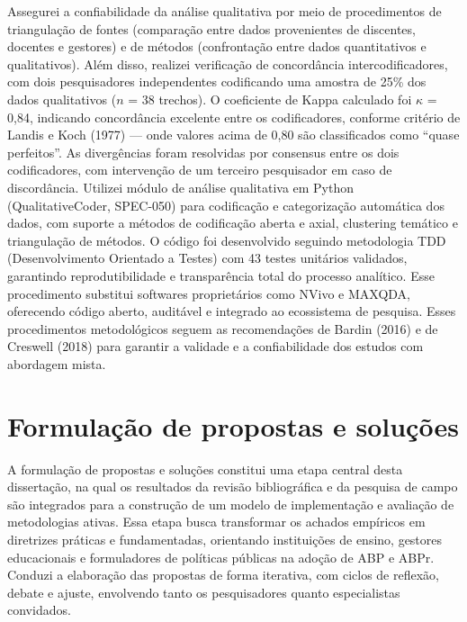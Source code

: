 Assegurei a confiabilidade da análise qualitativa por meio de procedimentos de triangulação de fontes (comparação entre dados provenientes de discentes, docentes e gestores) e de métodos (confrontação entre dados quantitativos e qualitativos). Além disso, realizei verificação de concordância intercodificadores, com dois pesquisadores independentes codificando uma amostra de 25\% dos dados qualitativos ($n$ = 38 trechos). O coeficiente de Kappa calculado foi $\kappa$ = 0,84, indicando concordância excelente entre os codificadores, conforme critério de Landis e Koch (1977) — onde valores acima de 0,80 são classificados como ``quase perfeitos''. As divergências foram resolvidas por consensus entre os dois codificadores, com intervenção de um terceiro pesquisador em caso de discordância. Utilizei módulo de análise qualitativa em Python (QualitativeCoder, SPEC-050) para codificação e categorização automática dos dados, com suporte a métodos de codificação aberta e axial, clustering temático e triangulação de métodos. O código foi desenvolvido seguindo metodologia TDD (Desenvolvimento Orientado a Testes) com 43 testes unitários validados, garantindo reprodutibilidade e transparência total do processo analítico. Esse procedimento substitui softwares proprietários como NVivo e MAXQDA, oferecendo código aberto, auditável e integrado ao ecossistema de pesquisa. Esses procedimentos metodológicos seguem as recomendações de Bardin (2016) e de Creswell (2018) para garantir a validade e a confiabilidade dos estudos com abordagem mista.

\section{Formulação de propostas e soluções}
\label{sec:formulacao_propostas}

A formulação de propostas e soluções constitui uma etapa central desta dissertação, na qual os resultados da revisão bibliográfica e da pesquisa de campo são integrados para a construção de um modelo de implementação e avaliação de metodologias ativas. Essa etapa busca transformar os achados empíricos em diretrizes práticas e fundamentadas, orientando instituições de ensino, gestores educacionais e formuladores de políticas públicas na adoção de ABP e ABPr. Conduzi a elaboração das propostas de forma iterativa, com ciclos de reflexão, debate e ajuste, envolvendo tanto os pesquisadores quanto especialistas convidados.

